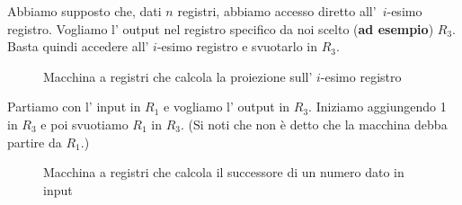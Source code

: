 \begin{esempio}[Proiezione \( p_n^i(x_1, \ldots, x_n)=x_i \).]

    Abbiamo supposto che, dati \( n \) registri, abbiamo accesso
    diretto \mbox{all' \( i \)-esimo} registro. Vogliamo l' output nel
    registro specifico da noi scelto (\textbf{ad esempio}) \( R_{3}
    \). Basta quindi accedere all' \( i \)-esimo registro e svuotarlo
    in \( R_{3} \).

    \begin{figure}[hbtp]
    \hspace{0cm}
    \caption{Macchina a registri che calcola la proiezione sull' \( i \)-esimo registro}
    \end{figure}

\end{esempio}

\begin{esempio}[Successore]

    Partiamo con l' input in \( R_1 \) e vogliamo l' output in \(
    R_{3} \). Iniziamo aggiungendo 1 in \( R_{3} \) e poi svuotiamo \(
    R_1 \) in \( R_{3} \). (Si noti che non \`e detto che la macchina
    debba partire da \( R_1 \).)

    \begin{figure}[hbtp]
    \hspace{0cm}
    \caption{Macchina a registri che calcola il successore di un numero dato in input}
    \end{figure}

\end{esempio}

